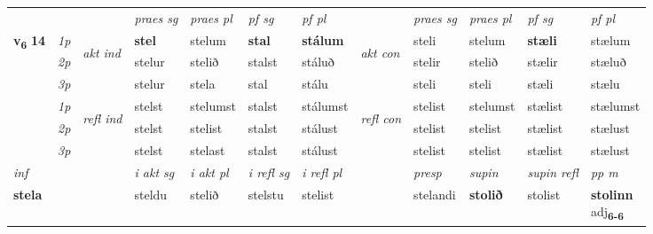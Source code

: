 \begin{longtable}[l]{X>{\footnotesize\itshape}llXXXXlXXXX}
 & &   & \textit{praes sg}  & \textit{praes pl}    & \textit{ pf sg} & \textit{pf pl} & & \textit{praes sg}  & \textit{praes pl}    & \textit{pf sg} & \textit{pf pl }  \\ \cmidrule{4-7} \cmidrule{9-12}
 \multirow{2}{*}{{{\textbf{v{\textsubscript{6}}} \Large{\textbf{14}}}}}  & 1p & \multirow{3}{*}{\begin{turn}{90}\textit{akt ind}\end{turn}} & \textbf{stel} & stelum & \textbf{stal} & \textbf{stálum} & \multirow{3}{*}{\begin{turn}{90}\textit{akt con}\end{turn}} &steli & stelum & \textbf{stæli} & stælum\\*
 & 2p &  &  stelur  & stelið & stalst & stáluð & & stelir & stelið & stælir & stæluð \\*
 & 3p &  & stelur & stela & stal & stálu & & steli & steli& stæli & stælu \\*
\cmidrule{4-7} \cmidrule{9-12}
 & 1p & \multirow{3}{*}{\begin{turn}{90}\textit{refl ind}\end{turn}}  & stelst & stelumst & stalst & stálumst & \multirow{3}{*}{\begin{turn}{90}\textit{refl con}\end{turn}}  &stelist & stelumst & stælist & stælumst \\*
 & 2p &  & stelst & stelist & stalst & stálust & &stelist & stelist & stælist & stælust \\*
 & 3p  & & stelst & stelast & stalst & stálust & & stelist & stelist& stælist & stælust \\*
\cmidrule{4-7} \cmidrule{9-12}

   {\textit{inf}} & &  & \textit{i akt sg} & \textit{i akt pl} & \textit{i refl sg} & \textit{i refl pl} && \textit{presp} & \textit{supin} & \textit{supin refl} & \textit{pp m} \\*
  {\textbf{stela}} & && steldu  & stelið & stelstu & stelist && stelandi &  \textbf{stolið} & stolist & \specialcell{\textbf{stolinn} \\ adj\textbf{\textsubscript{6-6}}} \\*

\midrule


\end{longtable}
